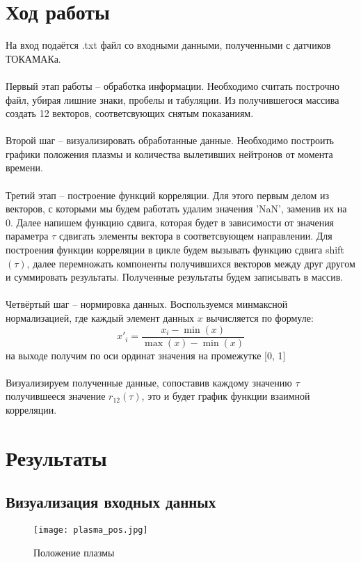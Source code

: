 \documentclass{article}
\begin{document}
\section{Ход работы}
\noindent На вход подаётся .txt файл со входными данными, полученными с датчиков ТОКАМАКа. 
\\\\
\noindent Первый этап работы -- обработка информации. Необходимо считать построчно файл, убирая лишние знаки, пробелы и табуляции. Из получившегося массива создать 12 векторов, соответсвующих снятым показаниям.
\\\\
\noindent Второй шаг -- визуализировать обработанные данные. Необходимо построить графики положения плазмы и количества вылетивших нейтронов от момента времени.
\\\\ 
\noindent Третий этап -- построение функций корреляции. Для этого первым делом из векторов, с которыми мы будем работать удалим значения 'NaN', заменив их на 0. Далее напишем функцию сдвига, которая будет в зависимости от значения параметра $\tau$ сдвигать элементы вектора в соответсвующем направлении. Для построения функции корреляции в цикле будем вызывать функцию сдвига shift$(\tau)$, далее перемножать компоненты получившихся векторов между друг другом и суммировать результаты. Полученные результаты будем записывать в массив.
\\\\
\noindent Четвёртый шаг -- нормировка данных. Воспользуемся минмаксной нормализацией, где каждый элемент данных $x$ вычисляется по формуле:
$$x'_i=\frac{x_i - \min(x)}{\max(x)-\min(x)}$$
на выходе получим по оси ординат значения на промежутке [0, 1]
\\\\ 
\noindent Визуализируем полученные данные, сопоставив каждому значению $\tau$ получившееся значение $r_{12}(\tau)$, это и будет график функции взаимной корреляции.

\section{Результаты}
\subsection{Визуализация входных данных}
\begin{figure}[H]
		\centering
		\texttt{[image: plasma\_pos.jpg]}
		\caption{Положение плазмы}
		\label{fig:PP}
	\end{figure}
	
\end{document}

